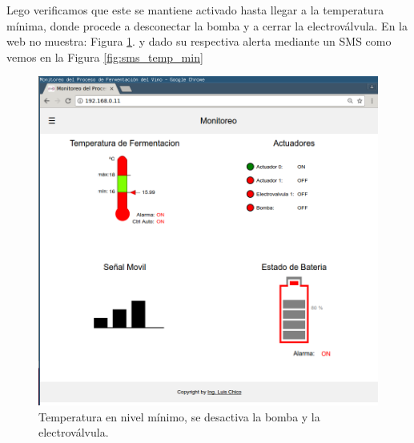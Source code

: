 Lego verificamos que este se mantiene activado hasta llegar a la temperatura mínima, donde procede a desconectar la bomba y a cerrar la electroválvula. En la web no muestra: Figura \ref{fig:auto_control_inactive}. y dado su respectiva alerta mediante un SMS como vemos en la Figura \ref{fig:sms_temp_min}

\begin{figure}[h]
  \centering
  \includegraphics[scale=.25]{./Figures/auto_control_inactive.png}
  \caption{Temperatura en nivel mínimo, se desactiva la bomba y la electroválvula.}
  \label{fig:auto_control_inactive}
\end{figure}


